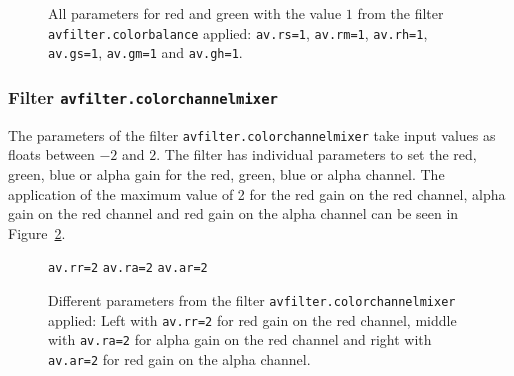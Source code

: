 \documentclass[../MasterThesis.tex]{subfiles}
\begin{document}
\begin{figure}[H]
	\begin{center}
		\caption[Red and green parameters set to $1$ with \texttt{avfilter.colorbalance}.]{All parameters for red and green with the value $1$  from the filter \texttt{avfilter.colorbalance} applied: \texttt{av.rs=1}, \texttt{av.rm=1}, \texttt{av.rh=1}, \texttt{av.gs=1}, \texttt{av.gm=1} and \texttt{av.gh=1}.}
		\label{figure:cb_yellow}
	\end{center}
\end{figure}














\subsubsection*{Filter \texttt{avfilter.colorchannelmixer}}

The parameters of the filter \texttt{avfilter.colorchannelmixer} take input values as floats between $-2$ and $2$. The filter has individual parameters to set the red, green, blue or alpha gain for the red, green, blue or alpha channel. The application of the maximum value of 2 for the red gain on the red channel, alpha gain on the red channel and red gain on the alpha channel can be seen in Figure~\ref{figure:rrraar}.

\begin{figure}[H]
	\begin{center}
		\small{
			\texttt{av.rr=2} \hspace*{0.22\textwidth} \texttt{av.ra=2} \hspace*{0.23\textwidth} \texttt{av.ar=2}}
		\caption[Different parameters from \texttt{avfilter.colorchannelmixer} applied.]{Different parameters from the filter \texttt{avfilter.colorchannelmixer} applied: Left with \texttt{av.rr=2} for red gain on the red channel, middle with \texttt{av.ra=2} for alpha gain on the red channel and right with \texttt{av.ar=2} for red gain on the alpha channel.}
		\label{figure:rrraar}
	\end{center}
\end{figure}
\end{document}
